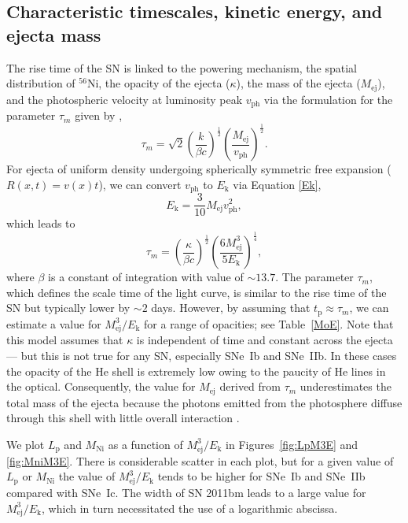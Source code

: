 \documentclass[a4paper,fleqn,usenatbib]{mnras}
\begin{document}
\subsection{Characteristic timescales, kinetic energy, and ejecta mass }
The rise time of the SN is linked to the powering mechanism, the spatial distribution of $^{56}$Ni, the opacity of the ejecta ($\kappa$), the mass of the ejecta ($M_{\mathrm{ej}}$), and the photospheric velocity at luminosity peak $v_{\mathrm{ph}}$ via the formulation for the parameter $\tau_m$ given by \cite{Arnett1982},  
\begin{equation}
\tau_m=\sqrt{2}\left(\frac{k}{\beta c}\right)^{\frac{1}{2}}\left(\frac{M_{\mathrm{ej}}}{v_{\mathrm{ph}}}\right)^{\frac{1}{2}}.
\label{tau}
\end{equation}
For ejecta of uniform density undergoing spherically symmetric free expansion ($R(x,t) = v(x)t$), we can convert $v_{\mathrm{ph}}$ to $E_{\mathrm{k}}$ via Equation \ref{Ek},
\begin{equation}
E_{\mathrm{k}}=\frac{3}{10}M_{\mathrm{ej}}v_{\mathrm{ph}}^2,
\label{Ek}
\end{equation}
which leads to
\begin{equation}
\tau_m=\left(\frac{\kappa}{\beta c}\right)^{\frac{1}{2}}\left(\frac{6M_{\mathrm{ej}}^3}{5E_{\mathrm{k}}}\right)^{\frac{1}{4}},
\label{tauEK}
\end{equation}
where $\beta$ is a constant of integration with value of $\sim 13.7$. The parameter $\tau_m$, which defines the scale time of the light curve, is similar to the rise time of the SN but typically lower by $\sim 2$ days. However, by assuming that $t_{\mathrm{p}}\approx \tau_m$, we can estimate a value for $M_{\mathrm{ej}}^3/E_{\mathrm{k}}$ for a range of opacities; see Table~\ref{MoE}. Note that this model assumes that $\kappa$ is independent of time and constant across the ejecta --- but this is not true for any SN, especially SNe~Ib and SNe~IIb. In these cases the opacity of the He shell is extremely low owing to the paucity of He lines in the optical. Consequently, the value for $M_{\mathrm{ej}}$ derived from $\tau_m$ underestimates the total mass of the ejecta because the photons emitted from the photosphere diffuse through this shell with little overall interaction \citep[also see][]{Wheeler2015}. 

We plot $L_{\mathrm{p}}$ and $M_{\mathrm{Ni}}$ as a function of $M_{\mathrm{ej}}^3/E_{\mathrm{k}}$ in Figures~\ref{fig:LpM3E} and \ref{fig:MniM3E}. There is considerable scatter in each plot, but for a given value of $L_{\mathrm{p}}$ or $M_{\mathrm{Ni}}$ the value of $M_{\mathrm{ej}}^3/E_{\mathrm{k}}$ tends to be higher for SNe~Ib and SNe~IIb compared with SNe~Ic. The width of SN 2011bm leads to a large value for $M_{\mathrm{ej}}^3/E_{\mathrm{k}}$, which in turn necessitated the use of a logarithmic abscissa.
\end{document}
